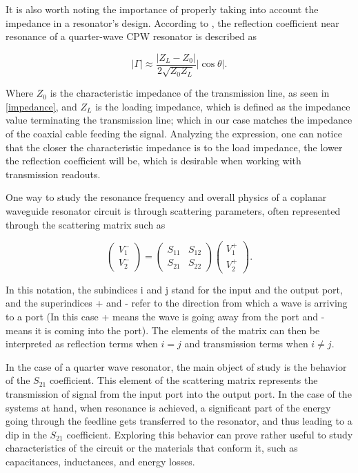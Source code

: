 \documentclass[12pt, a4paper]{article}
\begin{document}
It is also worth noting the importance of properly taking into account the impedance in a resonator's design. According to \cite[Chapter~5]{Pozar2012}, the reflection coefficient near resonance of a quarter-wave CPW resonator is described as

\begin{equation}
    \label{ImpReflection}
    |\Gamma| \approx \frac{|Z_L - Z_0|}{2 \sqrt{Z_0 Z_L}} |\cos\theta|.
\end{equation}

Where $Z_0$ is the characteristic impedance of the transmission line, as seen in \cref{impedance}, and $Z_L$ is the loading impedance, which is defined as the impedance value terminating the transmission line; which in our case matches the impedance of the coaxial cable feeding the signal. Analyzing the expression, one can notice that the closer the characteristic impedance is to the load impedance, the lower the reflection coefficient will be, which is desirable when working with transmission readouts.

One way to study the resonance frequency and overall physics of a coplanar waveguide resonator circuit is through scattering parameters, often represented through the scattering matrix such as \cite{Pozar2012}

\[
\begin{pmatrix}
    V^{-}_1\\
    V^{-}_2
\end{pmatrix}
=
\begin{pmatrix}
    S_{11} & S_{12}\\
    S_{21} & S_{22}
\end{pmatrix}
\begin{pmatrix}
    V^{+}_1\\
    V^{+}_2
\end{pmatrix}.
\]

In this notation, the subindices i and j stand for the input and the output port, and the superindices + and - refer to the direction from which a wave is arriving to a port (In this case + means the wave is going away from the port and - means it is coming into the port). The elements of the matrix can then be interpreted as reflection terms when $i = j$ and transmission terms when $i \neq j$. 

In the case of a quarter wave resonator, the main object of study is the behavior of the $S_{21}$ coefficient. This element of the scattering matrix represents the transmission of signal from the input port into the output port. In the case of the systems at hand, when resonance is achieved, a significant part of the energy going through the feedline gets transferred to the resonator, and thus leading to a dip in the $S_{21}$ coefficient. Exploring this behavior can prove rather useful to study characteristics of the circuit or the materials that conform it, such as capacitances, inductances, and energy losses.
\end{document}
